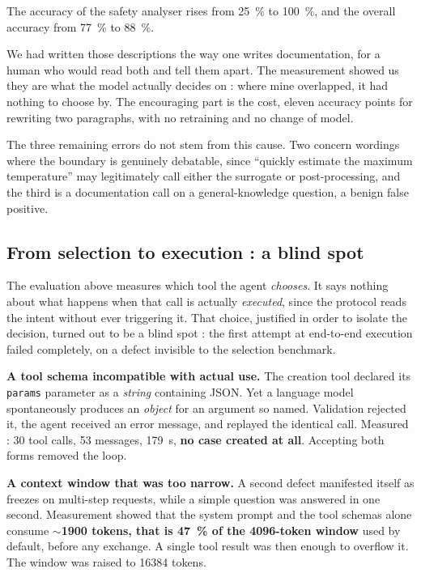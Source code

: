 The accuracy of the safety analyser rises from \SI{25}{\percent} to
\SI{100}{\percent}, and the overall accuracy from \SI{77}{\percent} to
\SI{88}{\percent}.

We had written those descriptions the way one writes documentation, for a human
who would read both and tell them apart. The measurement showed us they are what
the model actually decides on : where mine overlapped, it had nothing to choose
by. The encouraging part is the cost, eleven accuracy points for rewriting two
paragraphs, with no retraining and no change of model.

The three remaining errors do not stem from this cause. Two concern wordings
where the boundary is genuinely debatable, since ``quickly estimate the maximum
temperature'' may legitimately call either the surrogate or post-processing, and the third is a documentation call on a general-knowledge question, a benign
false positive.

\subsection{From selection to execution : a blind spot}
\label{sec:angle-mort}

The evaluation above measures which tool the agent \emph{chooses}. It says
nothing about what happens when that call is actually \emph{executed}, since the
protocol reads the intent without ever triggering it. That choice, justified in
order to isolate the decision, turned out to be a blind spot : the first attempt
at end-to-end execution failed completely, on a defect invisible to the
selection benchmark.

\textbf{A tool schema incompatible with actual use.} The creation tool declared
its \texttt{params} parameter as a \emph{string} containing JSON. Yet a language
model spontaneously produces an \emph{object} for an argument so named.
Validation rejected it, the agent received an error message, and replayed the
identical call. Measured : \num{30} tool calls, \num{53} messages,
\SI{179}{\second}, \textbf{no case created at all}. Accepting both forms removed
the loop.

\textbf{A context window that was too narrow.} A second defect manifested itself
as freezes on multi-step requests, while a simple question was answered in one
second. Measurement showed that the system prompt and the tool schemas alone
consume \textbf{$\sim$\num{1900} tokens, that is \SI{47}{\percent} of the
\num{4096}-token window} used by default, before any exchange. A single tool
result was then enough to overflow it. The window was raised to \num{16384}
tokens.

